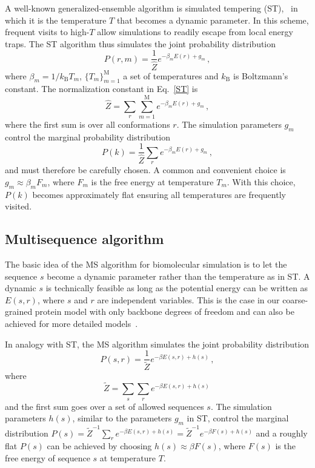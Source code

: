 \documentclass[%
 aip,
rsi,%
 amsmath,amssymb,
 reprint,%
]{revtex4-1}
\newcommand	 {\sbar}	{{s}}
\newcommand	 {\rbar}	{{r}}
\begin{document}
A well-known generalized-ensemble algorithm is simulated tempering (ST),~\cite{Marinari1992,Lyubartsev1992} in which it is the temperature $T$ that becomes a dynamic parameter. In this scheme, frequent visits to high-$T$ allow simulations to readily escape from local energy traps. The ST algorithm thus simulates the joint probability distribution 
\begin{equation}
P(\rbar,m) =\dfrac{1}{\hat{Z}} e^{-\beta_m E(\rbar) + g_m}\,,
\label{ST}
\end{equation}
where  $\beta_m=1/k_\mathrm{B} T_m$, $\{T_m\}_{m=1}^\mathrm{M}$ a set of temperatures and $k_\mathrm{B}$ is Boltzmann's constant. The normalization constant in Eq.~\ref{ST} is  
\begin{equation}
\hat{Z} = \sum_r \sum_{m=1}^{\mathrm{M}}e^{-\beta_m E(\rbar) + g_m}\,,
\end{equation}
where the first sum is over all conformations $\rbar$. The simulation parameters $g_m$ control the marginal probability distribution
\begin{equation}
P(k) = \frac{1}{\hat{Z}}\sum_r e^{-\beta_m E(\rbar) + g_m} \,,
\end{equation}
and must therefore be carefully chosen. A common and convenient choice is $g_m\approx \beta_m F_m$, where $F_m$ is the free energy at temperature $T_m$. With this choice, $P(k)$ becomes approximately flat ensuring all temperatures are frequently visited. 

\subsection{Multisequence algorithm}
\noindent 
The basic idea of the MS algorithm for biomolecular simulation is to let the sequence $\sbar$ become a dynamic parameter rather than the temperature as in ST. A dynamic $\sbar$ is technically feasible as long as the potential energy can be written as $E(\sbar,\rbar)$, where $\sbar$ and $\rbar$ are independent variables. This is the case in our coarse-grained protein model with only backbone degrees of freedom and can also be achieved for more detailed  models~\cite{Bhattacherjee2013,Wallin2017}. 

In analogy with ST, the MS algorithm simulates the joint probability distribution
\begin{equation}
P(\sbar,\rbar) =\dfrac{1}{\tilde{Z}}e^{-\beta E(\sbar,\rbar) + h(\sbar)}\,, 
\label{MS}
\end{equation}
where  
\begin{equation}
\tilde{Z} = \sum_{\sbar}\sum_{\rbar} e^{-\beta E(\sbar,\rbar)+ h(\sbar)}\,
\end{equation}
and the first sum goes over a set of allowed sequences $\sbar$. The simulation parameters $h(\sbar)$, similar to the parameters $g_m$ in ST, control the marginal distribution $P(\sbar)=\tilde{Z}^{-1}\sum_{\rbar} e^{-\beta E(\sbar,\rbar)+ h(\sbar)} = \tilde{Z}^{-1}e^{-\beta F(\sbar)+ h(\sbar)}$ and a roughly flat $P(\sbar)$ can be achieved by choosing $h(\sbar) \approx \beta F(\sbar)$, where $F(\sbar)$ is the free energy of sequence $\sbar$ at temperature $T$. 
\end{document}
